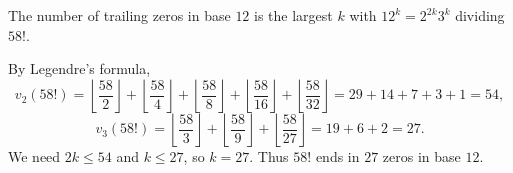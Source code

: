 The number of trailing zeros in base \(12\) is the largest \(k\) with \(12^k=2^{2k}3^k\) dividing \(58!\).

By Legendre's formula,
\[
v_2(58!)=\left\lfloor\dfrac{58}{2}\right\rfloor+\left\lfloor\dfrac{58}{4}\right\rfloor+\left\lfloor\dfrac{58}{8}\right\rfloor+\left\lfloor\dfrac{58}{16}\right\rfloor+\left\lfloor\dfrac{58}{32}\right\rfloor=29+14+7+3+1=54,
\]
\[
v_3(58!)=\left\lfloor\dfrac{58}{3}\right\rfloor+\left\lfloor\dfrac{58}{9}\right\rfloor+\left\lfloor\dfrac{58}{27}\right\rfloor=19+6+2=27 .
\]
We need \(2k\le54\) and \(k\le27\), so \(k=27\). Thus \(58!\) ends in \(\boxed{27}\) zeros in base \(12\).
